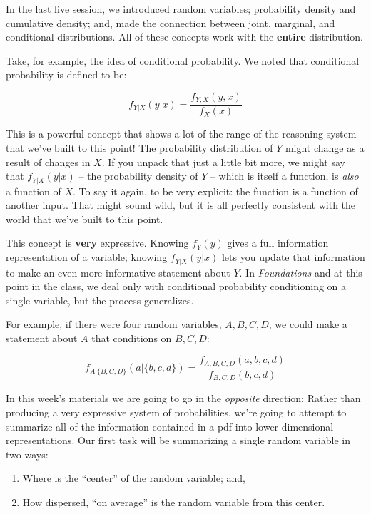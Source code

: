 \documentclass[
  letterpaper,
  DIV=11,
  numbers=noendperiod]{scrreprt}
\providecommand{\tightlist}{%
  \setlength{\itemsep}{0pt}\setlength{\parskip}{0pt}}\usepackage{longtable,booktabs,array}
\begin{document}
In the last live session, we introduced random variables; probability
density and cumulative density; and, made the connection between joint,
marginal, and conditional distributions. All of these concepts work with
the \textbf{entire} distribution.

Take, for example, the idea of conditional probability. We noted that
conditional probability is defined to be:

\[
  f_{Y|X}(y|x) = \frac{f_{Y,X}(y,x)}{f_{X}(x)}
\]

This is a powerful concept that shows a lot of the range of the
reasoning system that we've built to this point! The probability
distribution of \(Y\) might change as a result of changes in \(X\). If
you unpack that just a little bit more, we might say that
\(f_{Y|X}(y|x)\) -- the probability density of \(Y\) -- which is itself
a function, is \emph{also} a function of \(X\). To say it again, to be
very explicit: the function is a function of another input. That might
sound wild, but it is all perfectly consistent with the world that we've
built to this point.

This concept is \textbf{very} expressive. Knowing \(f_{Y}(y)\) gives a
full information representation of a variable; knowing \(f_{Y|X}(y|x)\)
lets you update that information to make an even more informative
statement about \(Y\). In \emph{Foundations} and at this point in the
class, we deal only with conditional probability conditioning on a
single variable, but the process generalizes.

For example, if there were four random variables, \(A, B, C, D\), we
could make a statement about \(A\) that conditions on \(B, C, D\):

\[
  f_{A|\{B,C,D\}}(a|\{b,c,d\}) = \frac{f_{A,B,C,D}(a,b,c,d)}{f_{B,C,D}(b,c,d)}
\]

In this week's materials we are going to go in the \emph{opposite}
direction: Rather than producing a very expressive system of
probabilities, we're going to attempt to summarize all of the
information contained in a pdf into lower-dimensional representations.
Our first task will be summarizing a single random variable in two ways:

\begin{enumerate}
\def\labelenumi{\arabic{enumi}.}
\tightlist
\item
  Where is the ``center'' of the random variable; and,
\item
  How dispersed, ``on average'' is the random variable from this center.
\end{enumerate}
\end{document}
